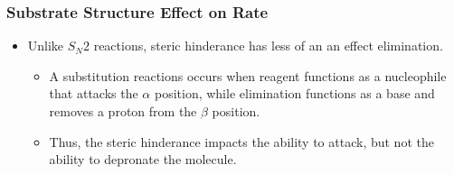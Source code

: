 \documentclass[12pt,a4paper]{article}
\begin{document}
\begin{itemize}
    \subsubsection{Substrate Structure Effect on Rate}
    \begin{itemize}
        \item Unlike \(S_N2\) reactions, steric hinderance has {\color{o-Sun}less} of an an effect elimination.
            \begin{itemize}
                \item A {\color{o-Sun}substitution} reactions occurs when reagent functions as a {\color{o-Sun}nucleophile} that attacks the $\alpha$ position, while {\color{o-Sun}elimination} functions as a base and removes a proton from the $\beta$ position.
                \item Thus, the steric hinderance impacts the ability to attack, but not the ability to depronate the molecule.
            \end{itemize}
    \end{itemize}

\end{itemize}
\end{document}
